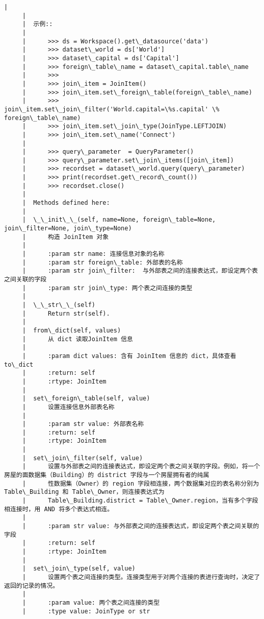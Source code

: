 \documentclass[11pt]{article}
\begin{document}
\begin{Verbatim}[commandchars=\\\{\}]
     |  
     |  
     |  示例::
     |  
     |      >>> ds = Workspace().get\_datasource('data')
     |      >>> dataset\_world = ds['World']
     |      >>> dataset\_capital = ds['Capital']
     |      >>> foreign\_table\_name = dataset\_capital.table\_name
     |      >>>
     |      >>> join\_item = JoinItem()
     |      >>> join\_item.set\_foreign\_table(foreign\_table\_name)
     |      >>> join\_item.set\_join\_filter('World.capital=\%s.capital' \% foreign\_table\_name)
     |      >>> join\_item.set\_join\_type(JoinType.LEFTJOIN)
     |      >>> join\_item.set\_name('Connect')
     |  
     |      >>> query\_parameter  = QueryParameter()
     |      >>> query\_parameter.set\_join\_items([join\_item])
     |      >>> recordset = dataset\_world.query(query\_parameter)
     |      >>> print(recordset.get\_record\_count())
     |      >>> recordset.close()
     |  
     |  Methods defined here:
     |  
     |  \_\_init\_\_(self, name=None, foreign\_table=None, join\_filter=None, join\_type=None)
     |      构造 JoinItem 对象
     |      
     |      :param str name: 连接信息对象的名称
     |      :param str foreign\_table: 外部表的名称
     |      :param str join\_filter:  与外部表之间的连接表达式，即设定两个表之间关联的字段
     |      :param str join\_type: 两个表之间连接的类型
     |  
     |  \_\_str\_\_(self)
     |      Return str(self).
     |  
     |  from\_dict(self, values)
     |      从 dict 读取JoinItem 信息
     |      
     |      :param dict values: 含有 JoinItem 信息的 dict，具体查看 to\_dict
     |      :return: self
     |      :rtype: JoinItem
     |  
     |  set\_foreign\_table(self, value)
     |      设置连接信息外部表名称
     |      
     |      :param str value: 外部表名称
     |      :return: self
     |      :rtype: JoinItem
     |  
     |  set\_join\_filter(self, value)
     |      设置与外部表之间的连接表达式，即设定两个表之间关联的字段。例如，将一个房屋的面数据集（Building）的 district 字段与一个房屋拥有者的纯属
     |      性数据集（Owner）的 region 字段相连接，两个数据集对应的表名称分别为 Table\_Building 和 Table\_Owner，则连接表达式为
     |      Table\_Building.district = Table\_Owner.region，当有多个字段相连接时，用 AND 将多个表达式相连。
     |      
     |      :param str value: 与外部表之间的连接表达式，即设定两个表之间关联的字段
     |      :return: self
     |      :rtype: JoinItem
     |  
     |  set\_join\_type(self, value)
     |      设置两个表之间连接的类型。连接类型用于对两个连接的表进行查询时，决定了返回的记录的情况。
     |      
     |      :param value: 两个表之间连接的类型
     |      :type value: JoinType or str

\end{Verbatim}
\end{document}
